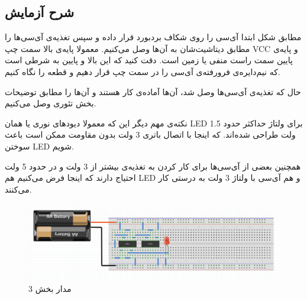 \subsection*{شرح آزمایش}
مطابق شکل ابتدا آی‌سی را روی شکاف بردبورد قرار داده و سپس تغذیه‌ی
آی‌سی‌ها را مطابق دیتاشیت‌شان
به آن‌ها وصل می‌کنیم.
معمولا پایه‌ی بالا سمت چپ VCC
و پایه‌ی پایین سمت راست
منفی یا زمین است.
دقت کنید که این بالا و پایین به شرطی است که نیم‌دایره‌ی فرورفته‌ی آی‌سی را در سمت چپ قرار دهیم و قطعه را نگاه کنیم.

حال که تغذیه‌ی آی‌سی‌ها وصل شد،
آن‌ها آماده‌ی کار هستند و آن‌ها را مطابق توضیحات بخش تئوری وصل می‌کنیم.


نکته‌ی مهم دیگر این که معمولا دیودهای نوری یا همان 
LED
برای ولتاژ حداکثر حدود
1.5 ولت طراحی شده‌اند.
که اینجا با اتصال باتری
3 
ولت بدون مقاومت ممکن است باعث سوختن LED
شویم.

همچنین بعضی از آی‌سی‌ها برای کار کردن به تغذیه‌ی بیشتر از 3 ولت
و در حدود 
5
ولت احتیاج دارند که اینجا فرض می‌کنیم هم LED و هم
آی‌سی با ولتاژ 3 ولت به درستی کار می‌کنند.


\begin{figure}[h]
\centering
\includegraphics[scale=0.3]{introduction/6.png}    
\caption{مدار بخش 3}
\end{figure}